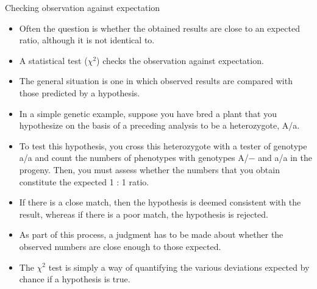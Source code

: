 \documentclass[11pt,ignorenonframetext,aspectratio=169]{beamer}
\providecommand{\tightlist}{%
  \setlength{\itemsep}{0pt}\setlength{\parskip}{0pt}}
\begin{document}
\begin{frame}{Checking observation against expectation}
\protect\hypertarget{checking-observation-against-expectation}{}
\small

\begin{itemize}
\tightlist
\item
  Often the question is whether the obtained results are close to an
  expected ratio, although it is not identical to.
\item
  A statistical test (\(\chi^2\)) checks the observation against
  expectation.
\item
  The general situation is one in which observed results are compared
  with those predicted by a hypothesis.
\item
  In a simple genetic example, suppose you have bred a plant that you
  hypothesize on the basis of a preceding analysis to be a heterozygote,
  A/a.
\item
  To test this hypothesis, you cross this heterozygote with a tester of
  genotype a/a and count the numbers of phenotypes with genotypes A/−
  and a/a in the progeny. Then, you must assess whether the numbers that
  you obtain constitute the expected 1 : 1 ratio.
\item
  If there is a close match, then the hypothesis is deemed consistent
  with the result, whereas if there is a poor match, the hypothesis is
  rejected.
\item
  As part of this process, a judgment has to be made about whether the
  observed numbers are close enough to those expected.
\item
  The \(\chi^2\) test is simply a way of quantifying the various
  deviations expected by chance if a hypothesis is true.
\end{itemize}
\end{frame}
\end{document}
